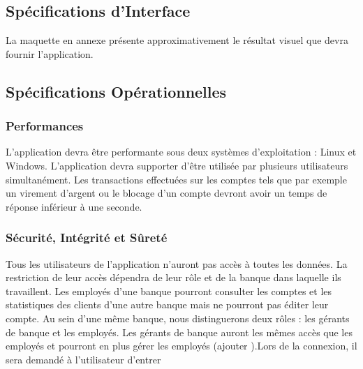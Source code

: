 \subsection{Spécifications d'Interface}
La maquette en annexe présente approximativement le résultat visuel que devra fournir l’application.

\subsection{Spécifications Opérationnelles}

\subsubsection{Performances}

L’application devra être performante sous deux systèmes d’exploitation : Linux et Windows. L’application devra supporter d’être utilisée par plusieurs utilisateurs simultanément. {\color{orange}{Ces utilisateurs ne pourront pas accéder au même compte en banque en même temps mais pourront effectuer des manipulations sur des comptes différents en même temps.}}{\color{green}{Les utilisateurs peuvent accéder au même compte en même temps et effectuer des opérations}} Les transactions effectuées sur les comptes tels que par exemple un virement d’argent ou le blocage d’un compte devront avoir un temps de réponse inférieur à une seconde.

\subsubsection{Sécurité, Intégrité et Sûreté}

Tous les utilisateurs de l’application n’auront pas accès à toutes les données. La restriction de leur accès dépendra de leur rôle et de la banque dans laquelle ils travaillent. Les employés d’une banque pourront consulter les comptes et les statistiques des clients d’une autre banque mais ne pourront pas éditer leur compte. Au sein d’une même banque, nous distinguerons deux rôles : les gérants de banque et les employés. Les gérants de banque auront les mêmes accès que les employés et pourront en plus gérer les employés (ajouter {\color{red}{ou supprimer des employés, modifier leur salaire}}).Lors de la connexion, il sera demandé à l’utilisateur d’entrer {\color{orange}{son nom, sa banque et son mot de passe.}} {\color{green}{L'utilisateur a uniquement besoin d'entrer son identifiant et son mot de passe.}} {\color{orange}{Grâce à son nom et sa banque, il sera possible de retrouver son rôle afin d’appliquer les restrictions nécessaires.}}{\color{green}{Grâce à son identifiant, il sera possible de retrouver sa banque et son rôle afin d'appliquer les restrictions nécessaires}}

